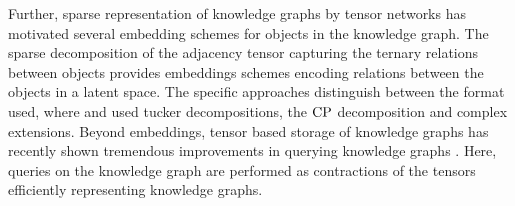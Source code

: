 
Further, sparse representation of knowledge graphs by tensor networks has motivated several embedding schemes for objects in the knowledge graph.
The sparse decomposition of the adjacency tensor capturing the ternary relations between objects provides embeddings schemes encoding relations between the objects in a latent space.
The specific approaches distinguish between the format used, where \cite{nickel_three-way_2011} and \cite{balazevic_tucker_2019} used tucker decompositions, \cite{yang_embedding_2015} the $\mathrm{CP}$ decomposition and \cite{trouillon_complex_2017} complex extensions.
Beyond embeddings, tensor based storage of knowledge graphs has recently shown tremendous improvements in querying knowledge graphs \cite{pan_tentris_2020}.
Here, queries on the knowledge graph are performed as contractions of the tensors efficiently representing knowledge graphs.


